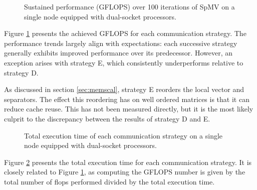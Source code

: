 \begin{figure}[H]
    \centering
    \caption{Sustained performance (GFLOPS) over 100 iterations of SpMV on a single node equipped with dual-socket  processors.}
    \label{fig:gflopsdefqsingle}
\end{figure}
Figure \ref{fig:gflopsdefqsingle} presents the achieved GFLOPS for each communication strategy. The performance trends largely align with expectations: each successive strategy generally exhibits improved performance over its predecessor. However, an exception arises with strategy E, which consistently underperforms relative to strategy D.
\medskip

As discussed in section \ref{sec:memscal}, strategy E reorders the local vector and separators. The effect this reordering has on well ordered matrices is that it can reduce cache reuse. This has not been measured directly, but it is the most likely culprit to the discrepancy between the results of strategy D and E.

 
\begin{figure}[H]
    \centering
    \caption{Total execution time of each communication strategy on a single node equipped with dual-socket  processors.}
    \label{fig:tdefqsingle}
\end{figure}

Figure \ref{fig:tdefqsingle} presents the total execution time for each communication strategy. It is closely related to Figure \ref{fig:gflopsdefqsingle}, as computing the GFLOPS number is given by the total number of flops performed divided by the total execution time.


